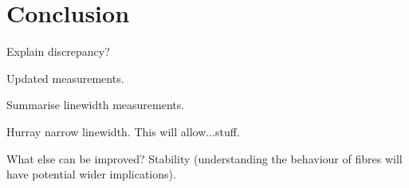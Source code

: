 \section{Conclusion}

{\color{red} Explain discrepancy?}

Updated measurements.


Summarise linewidth measurements.

Hurray narrow linewidth.
This will allow...stuff.

What else can be improved? Stability (understanding the behaviour of fibres will have potential wider implications).
